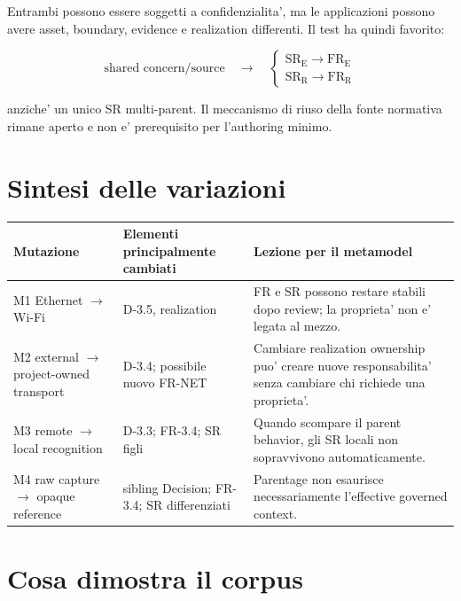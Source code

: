\documentclass[11pt,a4paper]{article}
\begin{document}
Entrambi possono essere soggetti a confidenzialita', ma le applicazioni possono avere asset, boundary, evidence e realization differenti. Il test ha quindi favorito:

\[
\text{shared concern/source} \quad\rightarrow\quad
\begin{cases}
\mathrm{SR_E} \rightarrow \mathrm{FR_E}\\
\mathrm{SR_R} \rightarrow \mathrm{FR_R}
\end{cases}
\]

anziche' un unico SR multi-parent. Il meccanismo di riuso della fonte normativa rimane aperto e non e' prerequisito per l'authoring minimo.

\section{Sintesi delle variazioni}

\begin{longtable}{p{}p{}p{}}
\toprule
\textbf{Mutazione} & \textbf{Elementi principalmente cambiati} & \textbf{Lezione per il metamodel} \\
\midrule
\endhead
M1 Ethernet $\rightarrow$ Wi-Fi & D-3.5, realization & FR e SR possono restare stabili dopo review; la proprieta' non e' legata al mezzo. \\
M2 external $\rightarrow$ project-owned transport & D-3.4; possibile nuovo FR-NET & Cambiare realization ownership puo' creare nuove responsabilita' senza cambiare chi richiede una proprieta'. \\
M3 remote $\rightarrow$ local recognition & D-3.3; FR-3.4; SR figli & Quando scompare il parent behavior, gli SR locali non sopravvivono automaticamente. \\
M4 raw capture $\rightarrow$ opaque reference & sibling Decision; FR-3.4; SR differenziati & Parentage non esaurisce necessariamente l'effective governed context. \\
\bottomrule
\end{longtable}

\section{Cosa dimostra il corpus}
\end{document}
